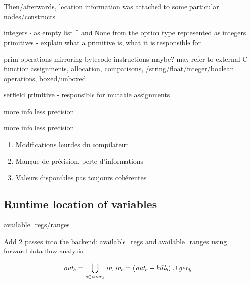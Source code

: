 
Then/afterwards, location information was attached to some particular nodes/constructs

integers - as empty list [] and None from the option type represented as integers
primitives - explain what a primitive is, what it is responsible for

prim operations mirroring bytecode instructions maybe?
may refer to external C function
assignments, allocation, comparisons, /string/float/integer/boolean operations,
boxed/unboxed

setfield primitive - responsible for mutable assignments

\begin{description}
\pro more info
\con less precision
\end{description}

\begin{itemize}
\tick more info
\fail less precision
\end{itemize}

\begin{enumerate}
\item Modifications lourdes du compilateur
\item Manque de précision, perte d'informations
\item Valeurs disponibles pas toujours cohérentes
\end{enumerate}

\subsection{Runtime location of variables}

available\_regs/ranges

Add 2 passes into the backend: available\_regs and available\_ranges
using forward data-flow analysis

\[
    \textit{out}_{b} = \bigcup_{s \in succ_{b}} \textit{in}_{s} \\\\
    \textit{in}_{b} = (\textit{out}_{b} - \textit{kill}_{b}) \cup \textit{gen}_{b}
\]

